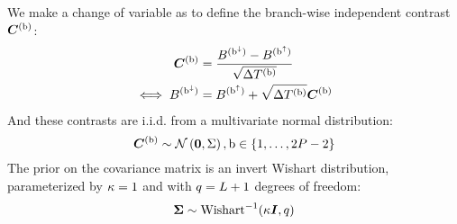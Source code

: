 We make a change of variable as to define the branch-wise independent contrast $\bm{C}^{(\text{b})}$:
\begin{align}
    \contrast\branchexp &= \dfrac{\brownian^{(\nodeDown)} - \brownian^{(\nodeUp)}}{\sqrt{\branchtime\branchexp}} \\
    \label{eq:independent_contrast}
    \iff \brownian^{(\nodeDown)} &= \brownian^{(\nodeUp)} + \sqrt{\branchtime\branchexp}\contrast\branchexp
\end{align}
And these contrasts are i.i.d.
from a multivariate normal distribution:
\begin{equation}
    \label{eq:Distribcontrast}
    \contrast\branchexp \sim \mathcal{N}\left(\bm{0}, \Covariancematrix \right), \Setbranch
\end{equation}
The prior on the covariance matrix is an invert Wishart distribution, parameterized by $\kappa=1$ and with $q=L + 1$ degrees of freedom:
\begin{equation}
    \label{eq:Distribcovariance}
    \CovarianceMatrix \sim \mathrm{Wishart}^{-1} (\covariancekappa \Identitymatrix, \covariancedf)
\end{equation}

